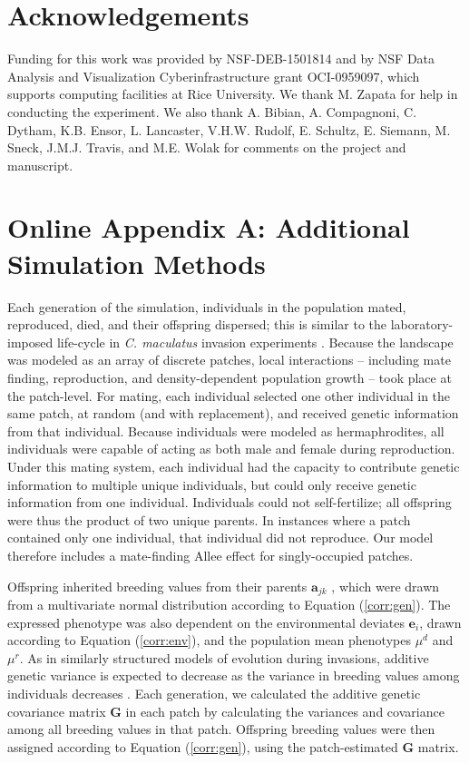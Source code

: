 \documentclass[11pt]{article}
\begin{document}
\section*{Acknowledgements}
Funding for this work was provided by NSF-DEB-1501814 and by NSF Data Analysis and Visualization Cyberinfrastructure grant OCI-0959097, which supports computing facilities at Rice University. We thank M. Zapata for help in conducting the experiment. We also thank A. Bibian, A. Compagnoni, C. Dytham, K.B. Ensor, L. Lancaster, V.H.W. Rudolf, E. Schultz, E. Siemann, M. Sneck, J.M.J. Travis, and M.E. Wolak for comments on the project and manuscript.

\newpage{}
\section*{Online Appendix A: Additional Simulation Methods}
Each generation of the simulation, individuals in the population mated, reproduced, died, and their offspring dispersed; this is similar to the laboratory-imposed life-cycle in \textit{C. maculatus} invasion experiments \citep{miller_sex_2013,wagner_genetic_2016,ochocki_rapid_2017}.
Because the landscape was modeled as an array of discrete patches, local interactions -- including mate finding, reproduction, and density-dependent population growth -- took place at the patch-level.
For mating, each individual selected one other individual in the same patch, at random (and with replacement), and received genetic information from that individual.
Because individuals were modeled as hermaphrodites, all individuals were capable of acting as both male and female during reproduction.
Under this mating system, each individual had the capacity to contribute genetic information to multiple unique individuals, but could only receive genetic information from one individual.
Individuals could not self-fertilize; all offspring were thus the product of two unique parents.
In instances where a patch contained only one individual, that individual did not reproduce.
Our model therefore includes a mate-finding Allee effect for singly-occupied patches.

Offspring inherited breeding values from their parents $\bm{a}_{jk}$ , which were drawn from a multivariate normal distribution according to Equation (\ref{corr:gen}).
The expressed phenotype was also dependent on the environmental deviates $\bm{e}_{i}$, drawn according to Equation (\ref{corr:env}), and the population mean phenotypes $\mu^{d}$ and $\mu^{r}$.
As in similarly structured models of evolution during invasions, additive genetic variance is expected to decrease as the variance in breeding values among individuals decreases \citep{phillips_evolutionary_2015}.
Each generation, we calculated the additive genetic covariance matrix $\bm{G}$ in each patch by calculating the variances and covariance among all breeding values in that patch.
Offspring breeding values were then assigned according to Equation (\ref{corr:gen}), using the patch-estimated $\bm{G}$ matrix.
\end{document}
